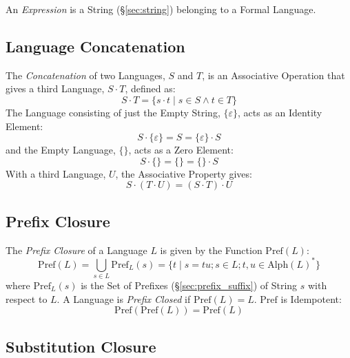 An \emph{Expression} is a String (\S\ref{sec:string}) belonging to a
Formal Language.



\subsection{Language Concatenation}\label{sec:language_concatenation}

The \emph{Concatenation} of two Languages, $S$ and $T$, is an
Associative Operation that gives a third Language, $S \cdot T$,
defined as:
\[
  S \cdot T = \{s \cdot t\;|\; s \in S \wedge t \in T\}
\]
The Language consisting of just the Empty String, $\{\varepsilon\}$,
acts as an Identity Element:
\[
  S \cdot \{\varepsilon\} = S = \{\varepsilon\} \cdot S
\]
and the Empty Language, $\{\}$, acts as a Zero Element:
\[
  S \cdot \{\} = \{\} = \{\} \cdot S
\]
With a third Language, $U$, the Associative Property gives:
\[
  S \cdot (T \cdot U) = (S \cdot T) \cdot U
\]



\subsection{Prefix Closure}\label{sec:prefix_closure}

The \emph{Prefix Closure} of a Language $L$ is given by the Function
$\mathrm{Pref}(L)$:
\[
  \mathrm{Pref}(L) = \bigcup_{s \in L} \mathrm{Pref}_L(s) =
  \{ t\;|\;s = tu; s \in L; t,u \in \mathrm{Alph}(L)^* \}
\]
where $\mathrm{Pref}_L(s)$ is the Set of Prefixes
(\S\ref{sec:prefix_suffix}) of String $s$ with respect to $L$. A
Language is \emph{Prefix Closed} if $\mathrm{Pref}(L) = L$.
$\mathrm{Pref}$ is Idempotent:
\[
  \mathrm{Pref}(\mathrm{Pref}(L)) = \mathrm{Pref}(L)
\]



\subsection{Substitution Closure}\label{sec:substitution_closure}

